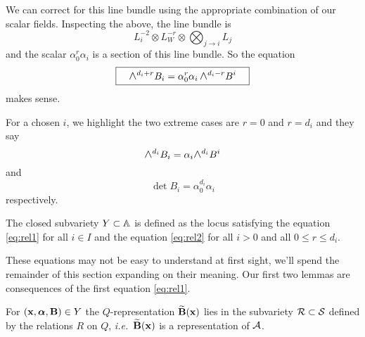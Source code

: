 \documentclass{amsart}
\newcommand{\balpha}{\boldsymbol{\alpha}}
\theoremstyle{definition}
\newcommand{\Wedge}{\mbox{\scalebox{1.2}{$\wedge$}}}
\newcommand\VW{V_W}
\newcommand\Y{Y}
\begin{document}
We can correct for this line bundle using the appropriate combination of our scalar fields. Inspecting the above, the line bundle is 
$$ L_i^{-2}\otimes L_W^{-r} \otimes \bigotimes_{j\to i} L_j $$
and the scalar $\alpha_0^r\alpha_i$ is a section of this line bundle. So the equation
\begin{equation}\label{eq:rel2}
\boxed{\quad \Wedge^{d_i+r} B_i  = \alpha_0^r \alpha_i\, \Wedge^{d_i-r} B^i \quad }
\end{equation}
makes sense.

For a chosen $i$, we highlight the two extreme cases are $r=0$ and $r=d_i$ and they say
\begin{equation}\label{eq:r=0}\Wedge^{d_i} B_i = \alpha_i\Wedge^{d_i} B^i 
\end{equation}
and
\begin{equation}\label{eq:r=di} \det B_i = \alpha_0^{d_i}\alpha_i
\end{equation}
respectively. 


\begin{definition}\label{def:equa}
The closed subvariety $\Y \subset \bA$ is defined as the locus satisfying the equation \eqref{eq:rel1} for all $i\in I$ and the equation \eqref{eq:rel2} for all $i>0$ and all $0\leq r\leq d_i$.
\end{definition}

These equations may not be easy to understand at first sight, we'll spend the remainder of this section expanding on their meaning. Our first two lemmas are consequences of the first equation \eqref{eq:rel1}.

\begin{lemma}\label{lem:rela}
For $(\bfx, \balpha, \bfB) \in \Y$ 
the $Q$-representation $\widetilde{\mathbf{B}}(\mathbf{x})$ lies in the subvariety $\mathcal{R}\subset \mathcal{S}$ defined by the relations $R$ on $Q$, \emph{i.e.}~$\widetilde{\mathbf{B}}(\mathbf{x})$ is a representation of $\mathcal{A}$. 
\end{lemma}
\end{document}
